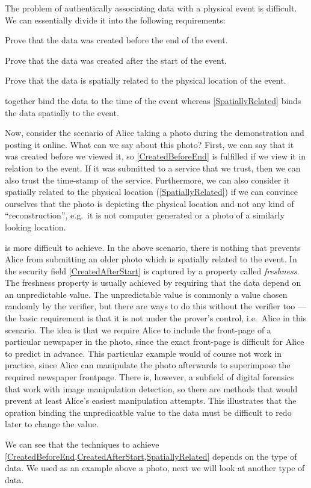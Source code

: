 The problem of authentically associating data with a physical event is 
difficult.
We can essentially divide it into the following requirements:
\begin{requirements}[A]
  \item\label{CreatedBeforeEnd} Prove that the data was created before the end 
    of the event.
  \item\label{CreatedAfterStart} Prove that the data was created after the 
    start of the event.
  \item\label{SpatiallyRelated} Prove that the data is spatially related to 
    the physical location of the event.
\end{requirements}
 together bind the data to the time of 
the event whereas \cref{SpatiallyRelated} binds the data spatially to the 
event.

Now, consider the scenario of Alice taking a photo during the demonstration and 
posting it online.
What can we say about this photo?
First, we can say that it was created before we viewed it, so 
\cref{CreatedBeforeEnd} is fulfilled if we view it in relation to the event.
If it was submitted to a service that we trust, then we can also trust the 
time-stamp of the service.
Furthermore, we can also consider it spatially related to the physical location
(\cref{SpatiallyRelated}) if we can convince ourselves that the photo is 
depicting the physical location and not any kind of \enquote{reconstruction}, 
e.g.\ it is not computer generated or a photo of a similarly looking location.

 is more difficult to achieve.
In the above scenario, there is nothing that prevents Alice from submitting an 
older photo which is spatially related to the event.
In the security field \cref{CreatedAfterStart} is captured by a property called 
\emph{freshness}.
The freshness property is usually achieved by requiring that the data depend on
an unpredictable value.
The unpredictable value is commonly a value chosen randomly by the verifier, 
but there are ways to do this without the verifier too --- the basic 
requirement is that it is not under the prover's control, i.e.\ Alice in this 
scenario.
The idea is that we require Alice to include the front-page of a particular 
newspaper in the photo, since the exact front-page is difficult for Alice to 
predict in advance.
This particular example would of course not work in practice, since Alice can 
manipulate the photo afterwards to superimpose the required newspaper 
frontpage.
There is, however, a subfield of digital forensics that work with image 
manipulation detection, so there are methods that would prevent at least 
Alice's easiest manipulation attempts.
This illustrates that the opration binding the unpredicatble value to the data 
must be difficult to redo later to change the value.

We can see that the techniques to achieve 
\cref{CreatedBeforeEnd,CreatedAfterStart,SpatiallyRelated} depends on the type 
of data.
We used as an example above a photo, next we will look at another type of data.
